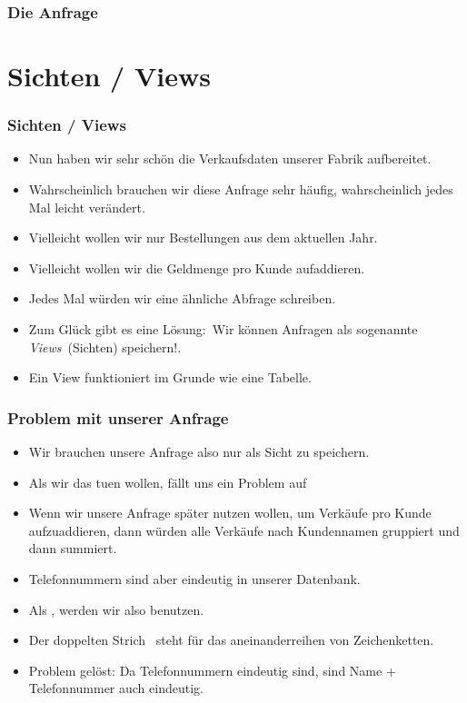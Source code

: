 \documentclass[aspectratio=169,mathserif,notheorems]{beamer}%
\begin{document}
%
\begin{frame}[t]
\frametitle{Die Anfrage}%
%
\end{frame}
%
\section{Sichten / Views}%
%
%
\begin{frame}%
\frametitle{Sichten / Views}%
\begin{itemize}%
\item Nun haben wir sehr schön die Verkaufsdaten unserer Fabrik aufbereitet.%
\item<2-> Wahrscheinlich brauchen wir diese Anfrage sehr häufig, wahrscheinlich jedes Mal leicht verändert.%
\item<3-> Vielleicht wollen wir nur Bestellungen aus dem aktuellen Jahr.%
\item<5-> Vielleicht wollen wir die Geldmenge pro Kunde aufaddieren.%
\item<7-> Jedes Mal würden wir eine ähnliche Abfrage schreiben.%
\item<9-> Zum Glück gibt es eine Lösung:~Wir können Anfragen als sogenannte \emph{Views}~(Sichten) speichern!\cite{PGDG:PD:CV}.%
\item<10-> Ein View funktioniert im Grunde wie eine Tabelle.%
\end{itemize}%
\end{frame}%
%
%
\begin{frame}%
\frametitle{Problem mit unserer Anfrage}%
\begin{itemize}%
\item Wir brauchen unsere Anfrage also nur als Sicht zu speichern.%
\item<2-> Als wir das tuen wollen, fällt uns ein Problem auf%
\item<4-> Wenn wir unsere Anfrage später nutzen wollen, um Verkäufe pro Kunde aufzuaddieren, dann würden alle Verkäufe nach Kundennamen gruppiert und dann summiert.%
\item<6-> Telefonnummern sind aber eindeutig in unserer Datenbank.%
\item<7-> Als , werden wir also  benutzen.%
\item<8-> Der doppelten Strich~\sqlil{||} steht für das aneinanderreihen von Zeichenketten.%
\item<10-> Problem gelöst: Da Telefonnummern eindeutig sind, sind Name + Telefonnummer auch eindeutig.%
\end{itemize}%
\end{frame}%
\end{document}

